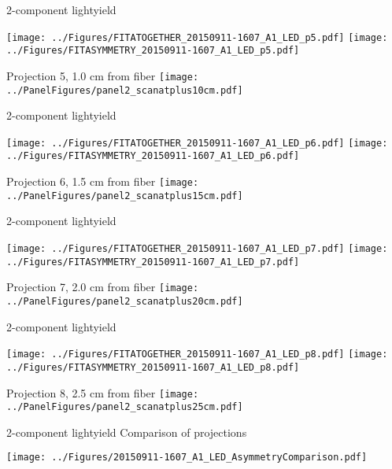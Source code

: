 \documentclass[compress,8pt]{beamer} %
\begin{document}
\begin{frame}{2-component lightyield}
\begin{adjustwidth}{-2em}{-2em}
\texttt{[image: ../Figures/FITATOGETHER\_20150911-1607\_A1\_LED\_p5.pdf]}
\texttt{[image: ../Figures/FITASYMMETRY\_20150911-1607\_A1\_LED\_p5.pdf]}
\end{adjustwidth}
Projection 5, 1.0 cm from fiber
\hfill \texttt{[image: ../PanelFigures/panel2\_scanatplus10cm.pdf]}
\end{frame}

\begin{frame}{2-component lightyield}
\begin{adjustwidth}{-2em}{-2em}
\texttt{[image: ../Figures/FITATOGETHER\_20150911-1607\_A1\_LED\_p6.pdf]}
\texttt{[image: ../Figures/FITASYMMETRY\_20150911-1607\_A1\_LED\_p6.pdf]}
\end{adjustwidth}
Projection 6, 1.5 cm from fiber
\hfill \texttt{[image: ../PanelFigures/panel2\_scanatplus15cm.pdf]}
\end{frame}

\begin{frame}{2-component lightyield}
\begin{adjustwidth}{-2em}{-2em}
\texttt{[image: ../Figures/FITATOGETHER\_20150911-1607\_A1\_LED\_p7.pdf]}
\texttt{[image: ../Figures/FITASYMMETRY\_20150911-1607\_A1\_LED\_p7.pdf]}
\end{adjustwidth}
Projection 7, 2.0 cm from fiber
\hfill \texttt{[image: ../PanelFigures/panel2\_scanatplus20cm.pdf]}
\end{frame}

\begin{frame}{2-component lightyield}
\begin{adjustwidth}{-2em}{-2em}
\texttt{[image: ../Figures/FITATOGETHER\_20150911-1607\_A1\_LED\_p8.pdf]}
\texttt{[image: ../Figures/FITASYMMETRY\_20150911-1607\_A1\_LED\_p8.pdf]}
\end{adjustwidth}
Projection 8, 2.5 cm from fiber
\hfill \texttt{[image: ../PanelFigures/panel2\_scanatplus25cm.pdf]}
\end{frame}



\begin{frame}{2-component lightyield}
Comparison of projections
\begin{center}
\texttt{[image: ../Figures/20150911-1607\_A1\_LED\_AsymmetryComparison.pdf]}
\end{center}
\end{frame}


\end{document}
